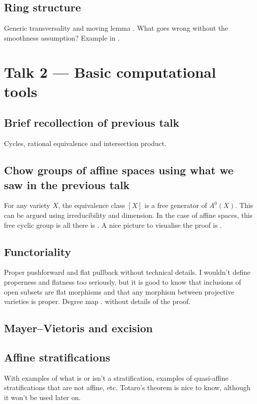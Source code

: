 \documentclass[A4paper, 12pt, british, reqno]{amsart}
\theoremstyle{plain}
\theoremstyle{definition}
\theoremstyle{remark}
\theoremstyle{plain}
\theoremstyle{definition}
\theoremstyle{remark}
\theoremstyle{plain}
\theoremstyle{definition}
\theoremstyle{remark}
\begin{document}
\subsection{Ring structure \cite[Thm.~1.5]{eh16}}
Generic transversality and moving lemma \cite[Thm.~1.6]{eh16}.
What goes wrong without the smoothness assumption?
Example in \cite[p.~20]{eh16}.

\section{Talk 2 --- Basic computational tools}

\subsection{Brief recollection of previous talk}
Cycles, rational equivalence and intersection product.

\subsection{Chow groups of affine spaces using what we saw in the previous talk}
For any variety $X$, the equivalence class $[X]$ is a free generator of $A^{0}(X)$.
This can be argued using irreducibility and dimension.
In the case of affine spaces, this free cyclic group is all there is \cite[Prop.~1.13]{eh16}.
A nice picture to visualise the proof is \cite[Fig.~1.7]{eh16}.

\subsection{Functoriality \cite[\S 1.3.6]{eh16}}
Proper pushforward and flat pullback without technical details.
I wouldn't define properness and flatness too seriously, but it is good to know that inclusions of open subsets are flat morphisms and that any morphism between projective varieties is proper.
Degree map \cite[Prop.~1.21]{eh16}.
\cite[Thm.~1.23]{eh16} without details of the proof.

\subsection{Mayer--Vietoris and excision \cite[\S 1.3.4]{eh16}}

\subsection{Affine stratifications \cite[\S 1.3.5]{eh16}}
With examples of what is or isn't a stratification, examples of quasi-affine stratifications that are not affine, etc.
Totaro's theorem \cite[Thm.~1.18]{eh16} is nice to know, although it won't be used later on.
\end{document}
